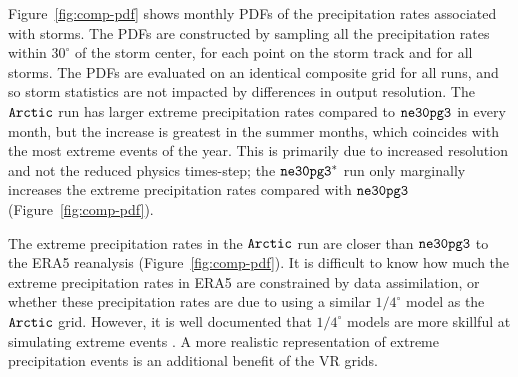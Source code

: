 \documentclass[draft]{agujournal2019}
\begin{document}
Figure~\ref{fig:comp-pdf} shows monthly PDFs of the precipitation rates associated with storms. The PDFs are constructed by sampling all the precipitation rates within $30^{\circ}$ of the storm center, for each point on the storm track and for all storms. The PDFs are evaluated on an identical composite grid for all runs, and so storm statistics are not impacted by differences in output resolution. The $\tt Arctic$ run has larger extreme precipitation rates compared to $\tt ne30pg3$ in every month, but the increase is greatest in the summer months, which coincides with the most extreme events of the year. This is primarily due to increased resolution and not the reduced physics times-step; the $\tt ne30pg3^{*}$ run only marginally increases the extreme precipitation rates compared with $\tt ne30pg3$ (Figure~\ref{fig:comp-pdf}).

The extreme precipitation rates in the $\tt Arctic$ run are closer than $\tt ne30pg3$ to the ERA5 reanalysis (Figure~\ref{fig:comp-pdf}). It is difficult to know how much the extreme precipitation rates in ERA5 are constrained by data assimilation, or whether these precipitation rates are due to using a similar $1/4^{\circ}$ model as the $\tt Arctic$ grid. However, it is well documented that $1/4^{\circ}$ models are more skillful at simulating extreme events \cite{BetAl2013JC,OETAL2016JAMES}.  A more realistic representation of extreme precipitation events is an additional benefit of the VR grids.
\end{document}
